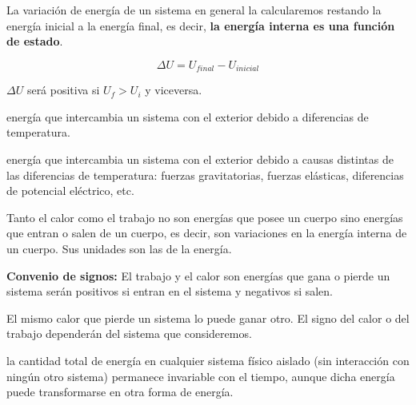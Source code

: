 \documentclass[
  spanish,
]{article}
\providecommand{\tightlist}{%
  \setlength{\itemsep}{0pt}\setlength{\parskip}{0pt}}
\begin{document}
La variación de energía de un sistema en general la calcularemos
restando la energía inicial a la energía final, es decir, \textbf{la
energía interna es una función de estado}.

\[\Delta U = U_{final} - U_{inicial}\]

\(\Delta U\) será positiva si \(U_f > U_i\) y viceversa.

\begin{description}
\tightlist
\item[\textbf{Calor (Q)}]
energía que intercambia un sistema con el exterior debido a diferencias
de temperatura.
\item[\textbf{Trabajo (W)}]
energía que intercambia un sistema con el exterior debido a causas
distintas de las diferencias de temperatura: fuerzas gravitatorias,
fuerzas elásticas, diferencias de potencial eléctrico, etc.
\end{description}

\hfill{}

Tanto el calor como el trabajo no son energías que posee un cuerpo sino
energías que entran o salen de un cuerpo, es decir, son variaciones en
la energía interna de un cuerpo. Sus unidades son las de la energía.

\textbf{Convenio de signos:} El trabajo y el calor son energías que gana
o pierde un sistema serán positivos si entran en el sistema y negativos
si salen.

El mismo calor que pierde un sistema lo puede ganar otro. El signo del
calor o del trabajo dependerán del sistema que consideremos.

\begin{description}
\tightlist
\item[\textbf{Ley de conservación de la energía}]
la cantidad total de energía en cualquier sistema físico aislado (sin
interacción con ningún otro sistema) permanece invariable con el tiempo,
aunque dicha energía puede transformarse en otra forma de energía.
\end{description}
\end{document}
